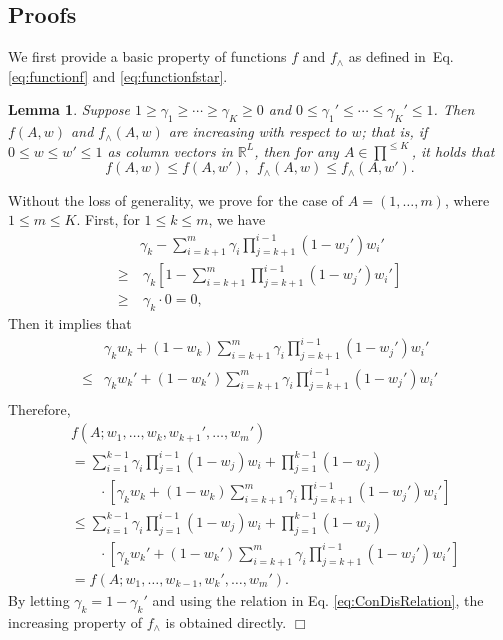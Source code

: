 \documentclass{article}
\newcommand{\RR}{\mathbb{R}}
\newtheorem{lemma}[theorem]{Lemma}%
\newenvironment{proof}{\noindent {\textbf{Proof. }}}{$\Box$ \medskip}
\begin{document}
\subsection{Proofs}

We first provide a basic property of functions $f$ and $f_{\wedge}$ as defined
in~Eq.\eqref{eq:functionf} and \eqref{eq:functionfstar}.
\begin{lemma}
\label{lem:increasing} 
Suppose $1 \geq \gamma_1 \geq \cdots \geq \gamma_K \geq 0$ and $0 \leq \gamma_1' \leq \cdots \leq \gamma_K' \leq 1$. Then $f(A, w)$ and $f_{\wedge}(A, w)$ are increasing with respect to $w$; that is, if $0 \leq w \leq w' \leq 1$ as column vectors in $\RR^L$, then for any $A \in \prod^{\leq K}$, it holds that
$$
f(A, w) \leq f(A, w'), ~~ f_{\wedge}(A, w) \leq f_{\wedge}(A, w').
$$
\end{lemma}
\begin{proof}
Without the loss of generality, we prove for the case
	of $A = (1, \ldots, m)$, where $1 \leq m \leq K$. 
First, for $1 \leq k \leq m$, we have
\begin{align*}
&\gamma_{k} - \sum_{i=k+1}^m \gamma_i \prod_{j = k + 1}^{i - 1} (1 - w_j') w_i'\\
\geq &~\gamma_k [1 - \sum_{i=k+1}^m \prod_{j=k+1}^{i-1}(1 - w_j') w_i']\\
\geq &~\gamma_{k} \cdot 0 = 0,
\end{align*}
Then it implies that
\begin{align*}
&\gamma_k w_k + (1 - w_k)\sum_{i=k+1}^m \gamma_i \prod_{j=k+1}^{i-1}(1 - w_j') w_i'\\
\leq &\gamma_k w_k' + (1 - w_k')\sum_{i=k+1}^m \gamma_i \prod_{j=k+1}^{i-1}(1 - w_j') w_i'\\
\end{align*}
Therefore, 
\begin{align*}
& f(A; w_1, \dots, w_k, w_{k+1}', \dots, w_m')\\
&=\sum_{i=1}^{k-1} \gamma_i \prod_{j=1}^{i-1}(1 - w_j) w_i + \prod_{j=1}^{k-1}(1 - w_j) \\
&\qquad \cdot [\gamma_k w_k + (1 - w_k)\sum_{i=k+1}^m \gamma_i \prod_{j=k+1}^{i-1}(1 - w_j') w_i']\\
&\leq \sum_{i=1}^{k-1} \gamma_i \prod_{j=1}^{i-1}(1 - w_j) w_i + \prod_{j=1}^{k-1}(1 - w_j) \\
&\qquad \cdot [\gamma_k w_k' + (1 - w_k')\sum_{i=k+1}^m \gamma_i \prod_{j=k+1}^{i-1}(1 - w_j') w_i']\\
&=f(A; w_1, \ldots, w_{k-1}, w_{k}', \ldots, w_m').
\end{align*}
By letting $\gamma_k = 1 - \gamma_k'$ and using the relation
	in Eq. \eqref{eq:ConDisRelation}, the increasing property of $f_{\wedge}$ is obtained directly.
\end{proof}
\end{document}
